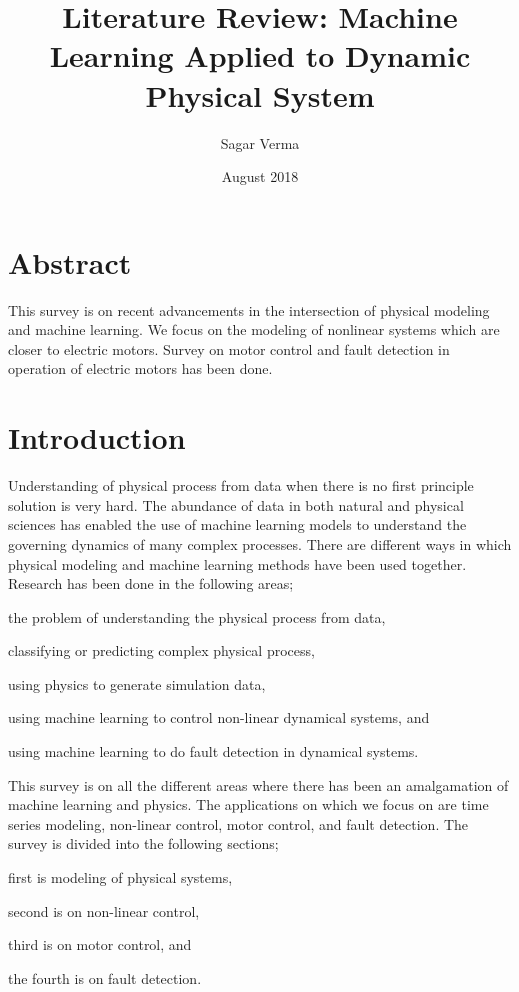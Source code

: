 \documentclass[conference]{IEEEtran}
\begin{document}
\title{Literature Review: Machine Learning Applied to Dynamic Physical System}
\author{Sagar Verma}
\date{August 2018}

\maketitle

\section{Abstract}
This survey is on recent advancements in the intersection of physical modeling and machine learning. We focus on the modeling of nonlinear systems which are closer to electric motors. Survey on motor control and fault detection in operation of electric motors has been done. \\

\section{Introduction}
Understanding of physical process from data when there is no first principle solution is very hard. The abundance of data in both natural and physical sciences has enabled the use of machine learning models to understand the governing dynamics of many complex processes. There are different ways in which physical modeling and machine learning methods have been used together. Research has been done in the following areas; \begin{enumerate*} [label=\itshape\alph*\upshape)] \item the problem of understanding the physical process from data, \item classifying or predicting complex physical process, \item using physics to generate simulation data, \item using machine learning to control non-linear dynamical systems, and \item using machine learning to do fault detection in dynamical systems. \end{enumerate*}

This survey is on all the different areas where there has been an amalgamation of machine learning and physics. The applications on which we focus on are time series modeling, non-linear control, motor control, and fault detection. The survey is divided into the following sections; \begin{enumerate*}[label=\itshape\alph*\upshape)] \item first is modeling of physical systems, \item second is on non-linear control, \item third is on motor control, and \item the fourth is on fault detection. \end{enumerate*} \\
\end{document}
